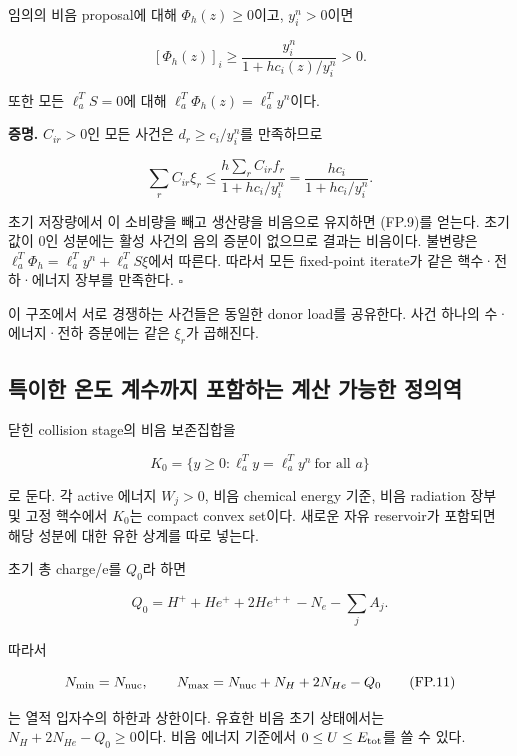 \documentclass[11pt,a4paper]{article}
\begin{document}
임의의 비음 proposal에 대해 \(\Phi_h(z)\ge0\)이고, \(y_i^n>0\)이면

\[
\boxed{
[\Phi_h(z)]_i
\ge
\frac{y_i^n}{1+h c_i(z)/y_i^n}>0.
}
\tag{FP.9}
\]

또한 모든 \(\ell_a^TS=0\)에 대해 \(\ell_a^T\Phi_h(z)=\ell_a^Ty^n\)이다.

\textbf{증명.} \(C_{ir}>0\)인 모든 사건은 \(d_r\ge c_i/y_i^n\)를 만족하므로

\[
\sum_r C_{ir}\xi_r
\le
\frac{h\sum_r C_{ir}f_r}{1+h c_i/y_i^n}
=
\frac{h c_i}{1+h c_i/y_i^n}.
\]

초기 저장량에서 이 소비량을 빼고 생산량을 비음으로 유지하면 (FP.9)를 얻는다. 초기값이 0인 성분에는 활성 사건의 음의 증분이 없으므로 결과는 비음이다. 불변량은 \(\ell_a^T\Phi_h=\ell_a^Ty^n+\ell_a^TS\xi\)에서 따른다. 따라서 모든 fixed-point iterate가 같은 핵수·전하·에너지 장부를 만족한다. \(\square\)

이 구조에서 서로 경쟁하는 사건들은 동일한 donor load를 공유한다. 사건 하나의 수·에너지·전하 증분에는 같은 \(\xi_r\)가 곱해진다.

\hypertarget{uxd2b9uxc774uxd55c-uxc628uxb3c4-uxacc4uxc218uxae4cuxc9c0-uxd3ecuxd568uxd558uxb294-uxacc4uxc0b0-uxac00uxb2a5uxd55c-uxc815uxc758uxc5ed}{%
\subsection{특이한 온도 계수까지 포함하는 계산 가능한 정의역}\label{uxd2b9uxc774uxd55c-uxc628uxb3c4-uxacc4uxc218uxae4cuxc9c0-uxd3ecuxd568uxd558uxb294-uxacc4uxc0b0-uxac00uxb2a5uxd55c-uxc815uxc758uxc5ed}}

닫힌 collision stage의 비음 보존집합을

\[
K_0=\{y\ge0:\ell_a^Ty=\ell_a^Ty^n\ \text{for all }a\}
\tag{FP.10}
\]

로 둔다. 각 active 에너지 \(W_j>0\), 비음 chemical energy 기준, 비음 radiation 장부 및 고정 핵수에서 \(K_0\)는 compact convex set이다. 새로운 자유 reservoir가 포함되면 해당 성분에 대한 유한 상계를 따로 넣는다.

초기 총 charge/e를 \(Q_0\)라 하면

\[
Q_0=H^++He^++2He^{++}-N_e-\sum_jA_j.
\]

따라서

\[
N_{\min}=N_{\rm nuc},\qquad
N_{\max}=N_{\rm nuc}+N_H+2N_{He}-Q_0
\tag{FP.11}
\]

는 열적 입자수의 하한과 상한이다. 유효한 비음 초기 상태에서는 \(N_H+2N_{He}-Q_0\ge0\)이다. 비음 에너지 기준에서 \(0\le U\le E_{\rm tot}\)를 쓸 수 있다.
\end{document}
